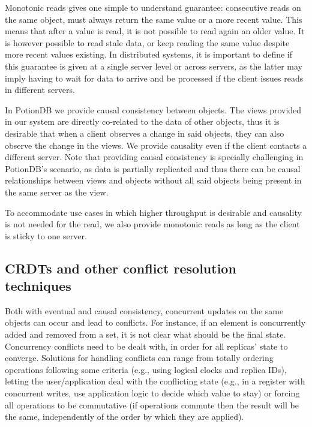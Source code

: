 Monotonic reads gives one simple to understand guarantee: consecutive reads on the same object, must always return the same value or a more recent value.
This means that after a value is read, it is not possible to read again an older value.
It is however possible to read stale data, or keep reading the same value despite more recent values existing.
In distributed systems, it is important to define if this guarantee is given at a single server level or across servers, as the latter may imply having to wait for data to arrive and be processed if the client issues reads in different servers.


In PotionDB we provide causal consistency between objects.
The views provided in our system are directly co-related to the data of other objects, thus it is desirable that when a client observes a change in said objects, they can also observe the change in the views.
We provide causality even if the client contacts a different server.
Note that providing causal consistency is specially challenging in PotionDB's scenario, as data is partially replicated and thus there can be causal relationships between views and objects without all said objects being present in the same server as the view.

To accommodate use cases in which higher throughput is desirable and causality is not needed for the read, we also provide monotonic reads as long as the client is sticky to one server.

\subsection{CRDTs and other conflict resolution techniques}

Both with eventual and causal consistency, concurrent updates on the same objects can occur and lead to conflicts.
For instance, if an element is concurrently added and removed from a set, it is not clear what should be the final state.
Concurrency conflicts need to be dealt with, in order for all replicas' state to converge.
Solutions for handling conflicts can range from totally ordering operations following some criteria (e.g., using logical clocks and replica IDs), letting the user/application deal with the conflicting state (e.g., in a register with concurrent writes, use application logic to decide which value to stay) or forcing all operations to be commutative (if operations commute then the result will be the same, independently of the order by which they are applied).

